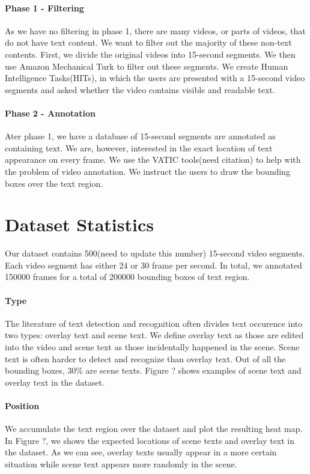 \documentclass{bmvc2k}
\begin{document}
\paragraph{Phase 1 - Filtering} As we have no filtering in phase 1, there are many videos, or parts of videos, that do not have text content. We want to filter out the majority of these non-text contents. First, we divide the original videos into 15-second segments. We then use Amazon Mechanical Turk to filter out these segments. We create Human Intelligence Tasks(HITs), in which the users are presented with a 15-second video segments and asked whether the video contains visible and readable text.

\paragraph{Phase 2 - Annotation} Ater phase 1, we have a database of 15-second segments are annotated as containing text. We are, however, interested in the exact location of text appearance on every frame. We use the VATIC tools(need citation) to help with the problem of video annotation. We instruct the users to draw the bounding boxes over the text region.

\section{Dataset Statistics}

Our dataset contains 500(need to update this number) 15-second video segments. Each video segment has either 24 or 30 frame per second. In total, we annotated 150000 frames for a total of 200000 bounding boxes of text region.

\paragraph{Type} The literature of text detection and recognition often divides text occurence into two types: overlay text and scene text. We define overlay text as those are edited into the video and scene text as those incidentally happened in the scene. Scene text is often harder to detect and recognize than overlay text. Out of all the bounding boxes, 30\% are scene texts. Figure ? shows examples of scene text and overlay text in the dataset.

\paragraph{Position} We accumulate the text region over the dataset and plot the resulting heat map. In Figure ?, we shows the expected locations of scene texts and overlay text in the dataset. As we can see, overlay texts usually appear in a more certain situation while scene text appears more randomly in the scene.
\end{document}
